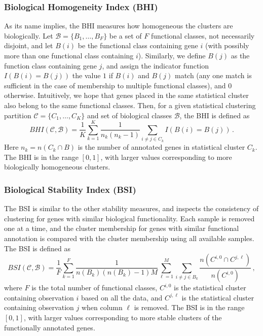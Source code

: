 \documentclass[11pt]{article}
\begin{document}
\subsubsection*{Biological Homogeneity Index (BHI)}

As its name implies, the BHI
measures how homogeneous the clusters are biologically.  
Let $\mathcal{B} = \{B_1, \ldots, B_F\}$ be a set of $F$ functional
classes, not necessarily disjoint, and let $B(i)$ be the functional
class containing gene $i$ (with possibly more
than one functional class containing $i$).  Similarly, we define
$B(j)$ as the function class containing gene $j$, and assign the
indicator function $I(B(i) = B(j))$ the value $1$ if $B(i)$ and $B(j)$
match (any one match is sufficient in the case of membership to
multiple functional classes), and 0 otherwise.  Intuitively, we hope that genes placed
in the same statistical cluster also belong to the same functional
classes.  Then, for a given statistical clustering
partition $\mathcal{C} = \{C_1, \ldots, C_K\}$ and set of biological
classes $\mathcal{B}$, the BHI is defined as 
$$
BHI(\mathcal{C},\mathcal{B}) = \frac{1}{K} \sum\limits_{k=1}^K
\frac{1}{n_k(n_k-1)} \sum\limits_{i\neq j \in C_k} I\left(B(i)=B(j)\right)\,.
$$
Here $n_k = n(C_k \cap B)$ is the number of annotated genes in
statistical cluster $C_k$. The BHI is in the range $[0,1]$, with
larger values corresponding to more biologically homogeneous clusters.

\subsubsection*{Biological Stability Index (BSI)}

The BSI is similar to the other stability
measures, and inspects the consistency of clustering for genes with
similar biological functionality.  Each sample is removed one at a
time, and the cluster membership for genes with similar functional annotation
is compared with the cluster membership using all available samples.
The BSI is defined as 
$$
BSI(\mathcal{C}, \mathcal{B}) = \frac{1}{F}\sum\limits_{k=1}^F
\frac{1}{n(B_k)(n(B_k)-1)M} \sum\limits_{\ell=1}^M \sum\limits_{i\neq j\in
    B_k} \frac{n(C^{i,0} \cap C^{j,\ell})}{n(C^{i,0})}\,,
$$
where $F$ is the total number of functional classes, $C^{i,0}$ is the statistical cluster containing observation $i$
based on all the data, and $C^{j,\ell}$ is the statistical cluster
containing observation $j$ when column $\ell$ is removed.  The BSI is
in the range $[0,1]$, with larger values corresponding to more stable
clusters of the functionally annotated genes.
\end{document}
